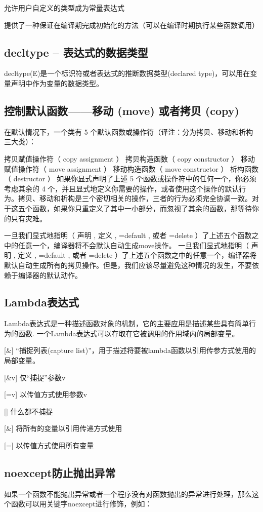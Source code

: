 允许用户自定义的类型成为常量表达式

提供了一种保证在编译期完成初始化的方法（可以在编译时期执行某些函数调用）

\subsection{decltype – 表达式的数据类型}

decltype(E)是一个标识符或者表达式的推断数据类型(declared type)，可以用在变量声明中作为变量的数据类型。

\subsection{控制默认函数——移动 (move) 或者拷贝 (copy)}
在默认情况下，一个类有 5 个默认函数或操作符（译注：分为拷贝、移动和析构三大类）：

拷贝赋值操作符（ copy assignment ）
拷贝构造函数（ copy constructor ）
移动赋值操作符（ move assignment ）
移动构造函数（ move constructor ）
析构函数（ destructor ）
如果你显式声明了上述 5 个函数或操作符中的任何一个，你必须考虑其余的 4 个，并且显式地定义你需要的操作，或者使用这个操作的默认行为。拷贝、移动和析构是三个密切相关的操作，三者的行为必须完全协调一致。对于这五个函数，如果你只重定义了其中一小部分，而忽视了其余的函数，那等待你的只有灾难。

一旦我们显式地指明（ 声明 , 定义 , =default , 或者 =delete ）了上述五个函数之中的任意一个，编译器将不会默认自动生成move操作。
一旦我们显式地指明（ 声明 , 定义 , =default , 或者 =delete ）了上述五个函数之中的任意一个，编译器将默认自动生成所有的拷贝操作。但是，我们应该尽量避免这种情况的发生，不要依赖于编译器的默认动作。

\subsection{Lambda表达式}
Lambda表达式是一种描述函数对象的机制，它的主要应用是描述某些具有简单行为的函数.
一个Lambda表达式可以存取在它被调用的作用域内的局部变量。

[\&] “捕捉列表(capture list)”，用于描述将要被lambda函数以引用传参方式使用的局部变量。

[\&v] 仅“捕捉”参数v

[=v] 以传值方式使用参数v

[] 什么都不捕捉

[\&] 将所有的变量以引用传递方式使用

[=] 以传值方式使用所有变量

\subsection{noexcept防止抛出异常}
如果一个函数不能抛出异常或者一个程序没有对函数抛出的异常进行处理，那么这个函数可以用关键字noexcept进行修饰，例如：

